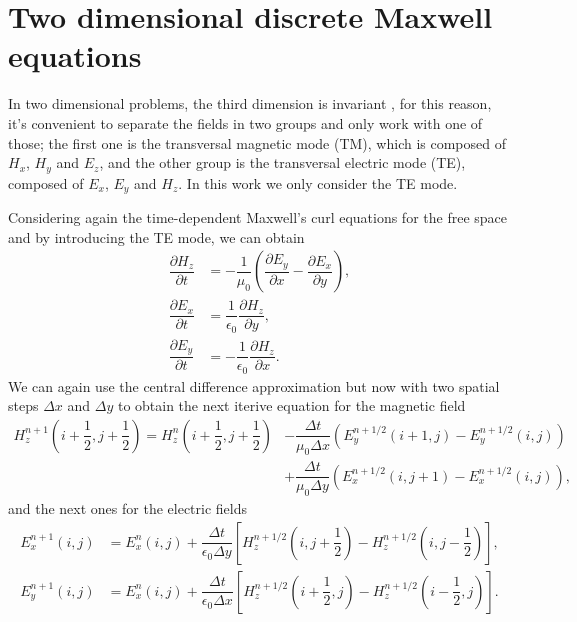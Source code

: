 \documentclass[12pt, oneside]{book}
\begin{document}
\section{Two dimensional discrete Maxwell equations}

In two dimensional problems, the third dimension is invariant \cite{peterson1992electromagnetic}, for this reason, it's convenient to separate the fields in two groups and only work with one of those; the first one is the transversal magnetic mode (TM), which is composed of $H_x$, $H_y$ and $E_z$, and the other group is the transversal electric mode (TE), composed of $E_x$, $E_y$ and $H_z$. In this work we only consider the TE mode.

\indent Considering again the time-dependent Maxwell's curl equations for the free space and by introducing the TE mode, we can obtain
\begin{align}
    \dfrac{\partial H_z}{\partial t} &= -\dfrac{1}{\mu_0} \left( \dfrac{\partial E_y}{\partial x} - \dfrac{\partial E_x}{\partial y} \right), \\
    \dfrac{\partial E_x}{\partial t} &= \dfrac{1}{\epsilon_0} \dfrac{\partial H_z}{\partial y}, \\
    \dfrac{\partial E_y}{\partial t} &= -\dfrac{1}{\epsilon_0} \dfrac{\partial H_z}{\partial x}. 
\end{align}
We can again use the central difference approximation but now with two spatial steps $\Delta x$ and $\Delta y$ to obtain the next iterive equation for the magnetic field
\begin{equation}
\begin{aligned}
    H_z^{n + 1}\left( i + \dfrac{1}{2},j + \dfrac{1}{2} \right) = H_z^{n}\left( i + \dfrac{1}{2},j + \dfrac{1}{2} \right) &- \dfrac{\Delta t}{\mu_0 \Delta x}\left( E_y^{n + 1/2}(i+1,j) - E_y^{n + 1/2}(i,j) \right) \\
                                                                                                                          &+ \dfrac{\Delta t}{\mu_0 \Delta y}\left( E_x^{n + 1/2}(i,j+1) - E_x^{n + 1/2}(i,j) \right),
\end{aligned}
\label{eq:FDTDMagneticField2D}
\end{equation}
and the next ones for the electric fields
\begin{align}
    E_x^{n+1}(i, j) &= E_x^{n}(i, j) + \dfrac{\Delta t}{\epsilon_0 \Delta y}\left[ H_z^{n+1/2}\left( i,j + \dfrac{1}{2} \right) - H_z^{n+1/2}\left( i,j - \dfrac{1}{2} \right) \right], \\
    E_y^{n+1}(i, j) &= E_x^{n}(i, j) + \dfrac{\Delta t}{\epsilon_0 \Delta x}\left[ H_z^{n+1/2}\left( i + \dfrac{1}{2},j \right) - H_z^{n+1/2}\left( i - \dfrac{1}{2},j \right) \right].
\end{align}
\end{document}
